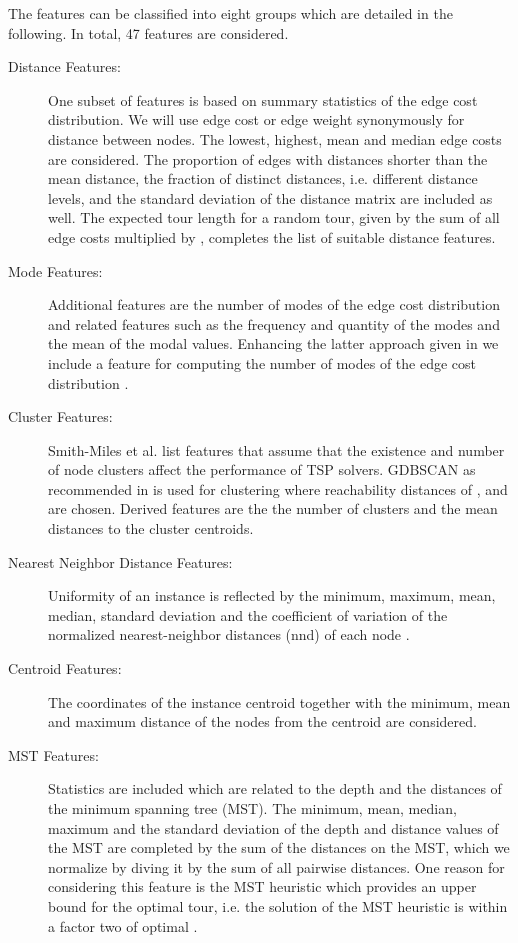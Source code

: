 \documentclass{article}
\begin{document}
The features can be classified into eight groups which are detailed in
the following. In total, 47 features are considered.
\begin{description}
\item[Distance Features:] One subset of features is based on summary
  statistics of the edge cost distribution. We will use edge cost or
  edge weight synonymously for distance between nodes.
  The lowest, highest, mean and median edge costs are
  considered. The proportion of edges with distances shorter than the
  mean distance, the fraction of distinct distances, i.e. different
  distance levels, and the standard deviation of the distance matrix
  are included as well. The expected tour length for a random tour,
  given by the sum of all edge costs multiplied by ,
  completes the list of suitable distance features.

\item[Mode Features:] Additional features \cite{KCHS11} are the number
  of modes of the edge cost distribution and related features such as
  the frequency and quantity of the modes and the mean of the modal
  values. Enhancing the latter approach given in \cite{KCHS11} we
  include a feature for computing the number of modes of the edge cost
  distribution \cite{MBTPWR11}.

\item[Cluster Features:] Smith-Miles et al. \cite{SH11,SMHL10} list
  features that assume that the existence and number of node clusters
  affect the performance of TSP solvers. GDBSCAN \cite{Sander98} as
  recommended in \cite{SMHL10} is used for clustering where
  reachability distances of ,  and  are
  chosen. Derived features are the the number of clusters and the mean
  distances to the cluster centroids.

\item[Nearest Neighbor Distance Features:] Uniformity of an instance
  is reflected by the minimum, maximum, mean, median, standard
  deviation and the coefficient of variation of the normalized
  nearest-neighbor distances (nnd) of each node \cite{SH11,SMHL10}.

\item[Centroid Features:] The coordinates of the instance centroid
  together with the minimum, mean and maximum distance of the nodes
  from the centroid are considered.

\item[MST Features:] Statistics are included which are related to the
  depth and the distances of the minimum spanning tree (MST). The
  minimum, mean, median, maximum and the standard deviation of the
  depth and distance values of the MST are completed by the sum of the
  distances on the MST, which we normalize by diving it by the sum of
  all pairwise distances. One reason for considering this feature is
  the MST heuristic which provides an upper bound for the optimal
  tour, i.e. the solution of the MST heuristic is within a factor two
  of optimal \cite{BT97}.


\end{description}
\end{document}
